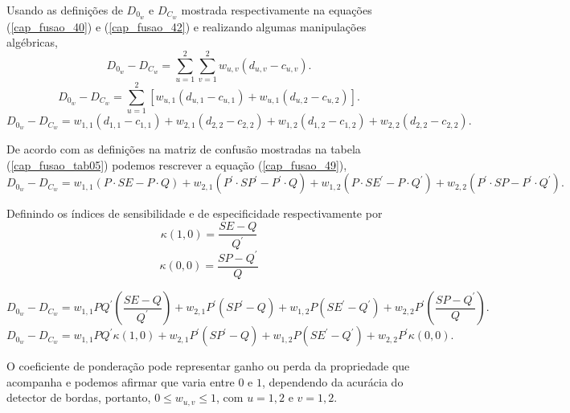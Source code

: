  Usando as definições de $D_{0_w}$ e $D_{C_w}$ mostrada respectivamente na equações (\ref{cap_fusao_40}) e (\ref{cap_fusao_42}) e realizando algumas manipulações algébricas, 
\begin{equation}\nonumber
	D_{0_w} - D_{C_w}=\sum_{u=1}^{2}\sum_{v=1}^{2}w_{u,v}(d_{u,v}- c_{u,v}).
\end{equation}
\begin{equation}\nonumber
	D_{0_w} - D_{C_w}=\sum_{u=1}^{2}\left[w_{u,1}(d_{u,1}- c_{u,1}) + w_{u,1}(d_{u,2}- c_{u,2}) \right].
\end{equation}
\begin{equation}\label{cap_fusao_49}
	D_{0_w} - D_{C_w}=w_{1,1}(d_{1,1}- c_{1,1}) + w_{2,1}(d_{2,2}- c_{2,2}) + w_{1,2}(d_{1,2}- c_{1,2}) + w_{2,2}(d_{2,2}- c_{2,2}).
\end{equation}

De acordo com as definições na matriz de confusão mostradas na tabela (\ref{cap_fusao_tab05}) podemos rescrever a equação (\ref{cap_fusao_49}), 
\begin{equation}\nonumber
	D_{0_w} - D_{C_w}=w_{1,1}(P\cdot SE- P\cdot Q) + w_{2,1}(P^{'}\cdot SP^{'}- P^{'}\cdot Q) + w_{1,2}(P\cdot SE^{'}- P\cdot Q^{'}) + w_{2,2}(P^{'}\cdot SP- P^{'}\cdot Q^{'}).
\end{equation}

Definindo os índices de sensibilidade e de especificidade respectivamente por
\begin{equation}\label{cap_fusao_50}
	\kappa(1,0) = \frac{SE-Q}{Q^{'}}
\end{equation}
\begin{equation}\label{cap_fusao_51}
	\kappa(0,0) = \frac{SP-Q^{'}}{Q}
\end{equation}

\begin{equation}\nonumber
	D_{0_w} - D_{C_w}=w_{1,1}PQ^{'}(\frac{SE-Q}{Q^{'}}) + w_{2,1}P^{'}(SP^{'}- Q) + w_{1,2}P(SE^{'}-Q^{'}) + w_{2,2}P^{'}(\frac{SP-Q^{'}}{Q}).
\end{equation}
\begin{equation}\label{cap_fusao_52}
	D_{0_w} - D_{C_w}=w_{1,1}PQ^{'}\kappa(1,0) + w_{2,1}P^{'}(SP^{'}- Q) + w_{1,2}P(SE^{'}-Q^{'}) + w_{2,2}P^{'}\kappa(0,0).
\end{equation}

O coeficiente de ponderação pode representar ganho ou perda da propriedade que acompanha e podemos afirmar que varia entre $0$ e $1$, dependendo da acurácia do detector de bordas, portanto, $0\le w_{u,v}\le 1$, com $u=1,2$ e $v=1,2$.

